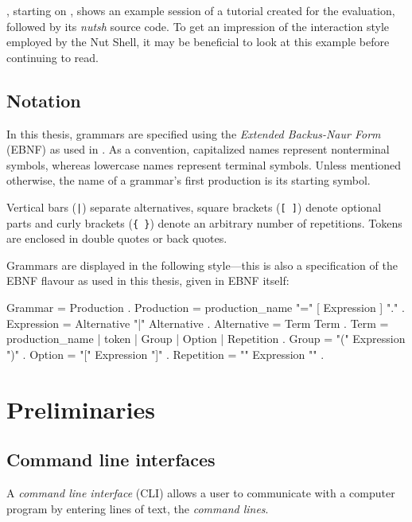 \documentclass[paper=a4,twoside,abstract=on,cleardoublepage=empty,numbers=noenddot,toc=bib,12pt,appendixprefix=true]{scrreprt}
\begin{document}
, starting on , shows an example session of a tutorial created for the evaluation, followed by its \emph{nutsh} source code. To get an impression of the interaction style employed by the Nut Shell, it may be beneficial to look at this example before continuing to read.

\section{Notation}
\label{sec:ebnf}

In this thesis, grammars are specified using the \emph{Extended Backus-Naur Form} (EBNF) as used in \cite{wirth77}. As a convention, capitalized names represent nonterminal symbols, whereas lowercase names represent terminal symbols. Unless mentioned otherwise, the name of a grammar's first production is its starting symbol.

Vertical bars (\texttt{|}) separate alternatives, square brackets (\texttt{[ ]}) denote optional parts and curly brackets (\texttt{\{ \}}) denote an arbitrary number of repetitions. Tokens are enclosed in double quotes or back quotes.

Grammars are displayed in the following style---this is also a specification of the EBNF flavour as used in this thesis, given in EBNF itself:

\begin{ebnf}
Grammar     = { Production } .
Production  = production_name "=" [ Expression ] "." .
Expression  = Alternative { "|" Alternative } .
Alternative = Term { Term } .
Term        = production_name | token | Group | Option | Repetition .
Group       = "(" Expression ")" .
Option      = "[" Expression "]" .
Repetition  = "{" Expression "}" .
\end{ebnf}

\chapter{Preliminaries}
\label{sec:preliminaries}

\section{Command line interfaces}
\label{sec:cli}

A \emph{command line interface} (\textsc{CLI}) allows a user to communicate with a computer program by entering lines of text, the \emph{command lines}.
\end{document}

